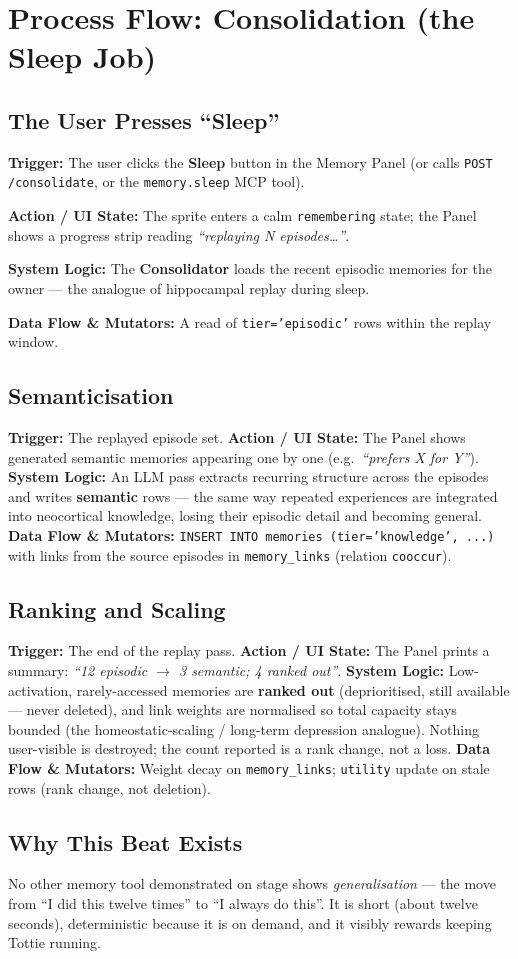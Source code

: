 \chapter{Process Flow: Consolidation (the Sleep Job)}

\section{The User Presses ``Sleep''}
\textbf{Trigger:} The user clicks the \textbf{Sleep} button in the Memory Panel (or calls
\texttt{POST /consolidate}, or the \texttt{memory.sleep} MCP tool).

\textbf{Action / UI State:} The sprite enters a calm \texttt{remembering} state; the Panel shows a
progress strip reading \emph{``replaying N episodes\ldots''}.

\textbf{System Logic:} The \textbf{Consolidator} loads the recent episodic memories for the owner ---
the analogue of hippocampal replay during sleep.

\textbf{Data Flow \& Mutators:} A read of \texttt{tier='episodic'} rows within the replay window.

\section{Semanticisation}
\textbf{Trigger:} The replayed episode set.
\textbf{Action / UI State:} The Panel shows generated semantic memories appearing one by one
(e.g.\ \emph{``prefers X for Y''}).
\textbf{System Logic:} An LLM pass extracts recurring structure across the episodes and writes
\textbf{semantic} rows --- the same way repeated experiences are integrated into neocortical
knowledge, losing their episodic detail and becoming general.
\textbf{Data Flow \& Mutators:} \texttt{INSERT INTO memories (tier='knowledge', ...)} with links from
the source episodes in \texttt{memory\_links} (relation \texttt{cooccur}).

\section{Ranking and Scaling}
\textbf{Trigger:} The end of the replay pass.
\textbf{Action / UI State:} The Panel prints a summary: \emph{``12 episodic $\rightarrow$ 3 semantic;
4 ranked out''}.
\textbf{System Logic:} Low-activation, rarely-accessed memories are \textbf{ranked out}
(deprioritised, still available --- never deleted), and link weights are normalised so total
capacity stays bounded (the homeostatic-scaling / long-term depression analogue). Nothing
user-visible is destroyed; the count reported is a rank change, not a loss.
\textbf{Data Flow \& Mutators:} Weight decay on \texttt{memory\_links}; \texttt{utility} update on
stale rows (rank change, not deletion).

\section{Why This Beat Exists}
No other memory tool demonstrated on stage shows \emph{generalisation} --- the move from ``I did this
twelve times'' to ``I always do this''. It is short (about twelve seconds), deterministic because it
is on demand, and it visibly rewards keeping Tottie running.
